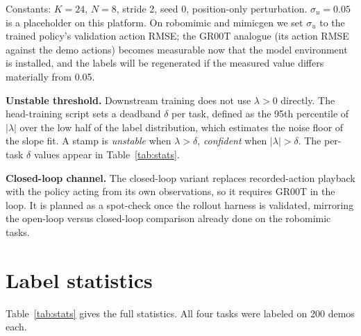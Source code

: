 \documentclass[11pt]{article}
\begin{document}
Constants: $K{=}24$, $N{=}8$, stride 2, seed 0, position-only perturbation.
$\sigma_u{=}0.05$ is a placeholder on this platform. On robomimic and mimicgen
we set $\sigma_u$ to the trained policy's validation action RMSE; the GR00T
analogue (its action RMSE against the demo actions) becomes measurable now that
the model environment is installed, and the labels will be regenerated if the
measured value differs materially from 0.05.

\textbf{Unstable threshold.} Downstream training does not use $\lambda > 0$
directly. The head-training script sets a deadband $\delta$ per task, defined
as the 95th percentile of $|\lambda|$ over the low half of the label
distribution, which estimates the noise floor of the slope fit. A stamp is
\emph{unstable} when $\lambda > \delta$, \emph{confident} when
$|\lambda| > \delta$. The per-task $\delta$ values appear in
Table~\ref{tab:stats}.

\textbf{Closed-loop channel.} The closed-loop variant replaces recorded-action
playback with the policy acting from its own observations, so it requires GR00T
in the loop. It is planned as a spot-check once the rollout harness is
validated, mirroring the open-loop versus closed-loop comparison already done
on the robomimic tasks.

\section{Label statistics}

Table~\ref{tab:stats} gives the full statistics. All four tasks were labeled on
200 demos each.
\end{document}
